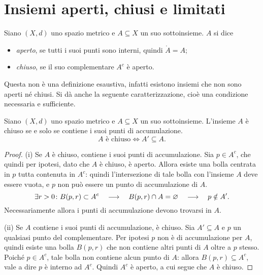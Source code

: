 \section{Insiemi aperti, chiusi e limitati}
\begin{definizione}
\label{d:chiuso-se-c-aperto}
Siano $(X,d)$ uno spazio metrico e $A\subseteq X$ un suo sottoinsieme. $A$ si dice
\begin{itemize}
\item \emph{aperto}, se tutti i suoi punti sono interni, quindi $\mathring{A}=A$;
\item \emph{chiuso}, se il suo complementare $A^c$ è aperto.
\end{itemize}
\end{definizione}
Questa non è una definizione esaustiva, infatti esistono insiemi che non sono aperti né chiusi. Si dà anche la seguente caratterizzazione, cioè una condizione necessaria e sufficiente.
\begin{teorema}
Siano $(X,d)$ uno spazio metrico e $A\subseteq X$ un suo sottoinsieme. L'insieme $A$ è chiuso se e solo se contiene i suoi punti di accumulazione.
\[
A\text{ è chiuso}\iff A'\subseteq A.
\]
\end{teorema}
\begin{proof}
(i) Se $A$ è chiuso, contiene i suoi punti di accumulazione.
Sia $p\in A^c$, che quindi per ipotesi, dato che $A$ è chiuso, è aperto. Allora esiste una bolla centrata in $p$ tutta contenuta in $A^c$: quindi l'intersezione di tale bolla con l'insieme $A$ deve essere vuota, e $p$ non può essere un punto di accumulazione di $A$.
\[
\exists r>0\colon B(p,r)\subset A^c\quad\longrightarrow\quad B(p,r)\cap A=\varnothing\quad\longrightarrow\quad p\notin A'.
\]
Necessariamente allora i punti di accumulazione devono trovarsi in $A$.

(ii) Se $A$ contiene i suoi punti di accumulazione, è chiuso.
Sia $A'\subseteq A$ e $p$ un qualsiasi punto del complementare. Per ipotesi $p$ non è di accumulazione per $A$, quindi esiste una bolla $B(p,r)$ che non contiene altri punti di $A$ oltre a $p$ stesso. Poiché $p\in A^c$, tale bolla non contiene alcun punto di $A$: allora $B(p,r)\subseteq A^c$, vale a dire $p$ è interno ad $A^c$. Quindi $A^c$ è aperto, a cui segue che $A$ è chiuso.
\end{proof}
